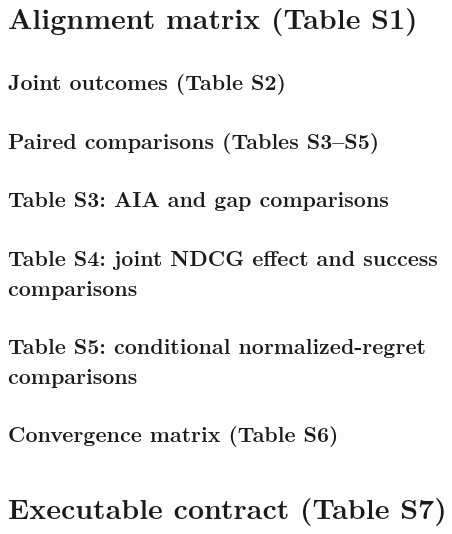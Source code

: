 \documentclass[manuscript,screen,anonymous]{acmart}
\begin{document}
\appendix

\renewcommand{\thesection}{S\arabic{section}}
\renewcommand{\thetable}{S\arabic{table}}
\renewcommand{\theHsection}{supplement.S\arabic{section}}
\renewcommand{\theHtable}{supplement.S\arabic{table}}
\section{Alignment matrix (Table S1)}

\begin{landscape}
\small
\renewcommand{\arraystretch}{0.92}
\setlength{\LTpre}{0pt}
\setlength{\LTpost}{0pt}
\section{Joint outcomes (Table S2)}

\end{landscape}
\begin{landscape}
\small
\renewcommand{\arraystretch}{0.92}
\setlength{\LTpre}{0pt}
\setlength{\LTpost}{0pt}
\section{Paired comparisons (Tables S3--S5)}
\subsection*{Table S3: AIA and gap comparisons}

\subsection*{Table S4: joint NDCG effect and success comparisons}

\subsection*{Table S5: conditional normalized-regret comparisons}

\end{landscape}
\begin{landscape}
\small
\renewcommand{\arraystretch}{0.94}
\setlength{\LTpre}{0pt}
\setlength{\LTpost}{0pt}
\section{Convergence matrix (Table S6)}

\end{landscape}
\section{Executable contract (Table S7)}

\end{document}
